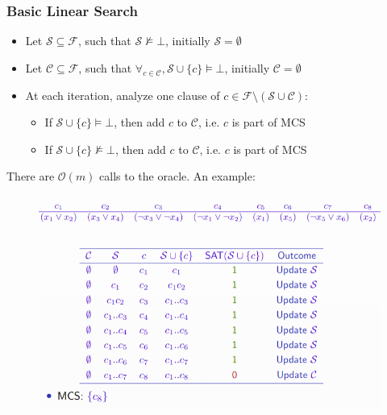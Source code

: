 \documentclass[10pt,a4paper]{report}
\begin{document}
\subsubsection{Basic Linear Search}
\begin{itemize}
    \item Let $\mathcal{S} \subseteq \mathcal{F}$, such that $\mathcal{S}\nvDash \bot$, initially $\mathcal{S} = \emptyset$
    \item Let $\mathcal{C} \subseteq \mathcal{F}$, such that $\forall_{c \in \mathcal{C}}, \mathcal{S} \cup \{c\} \vDash \bot $, initially $\mathcal{C} = \emptyset$
    \item At each iteration, analyze one clause of $c \in \mathcal{F} \setminus (\mathcal{S} \cup \mathcal{C})$:
    \begin{itemize}
        \item If $\mathcal{S} \cup \{c\} \vDash \bot$, then add $c$ to $\mathcal{C}$, i.e. $c$ is part of MCS
        \item If $\mathcal{S} \cup \{c\} \nvDash \bot$, then add $c$ to $\mathcal{C}$, i.e. $c$ is part of MCS
    \end{itemize}
\end{itemize}
There are $\mathcal{O}(m)$ calls to the oracle. An example:
\begin{figure}[H]
    \centering
    \includegraphics[scale=0.4]{15.png}
\end{figure}
\end{document}
